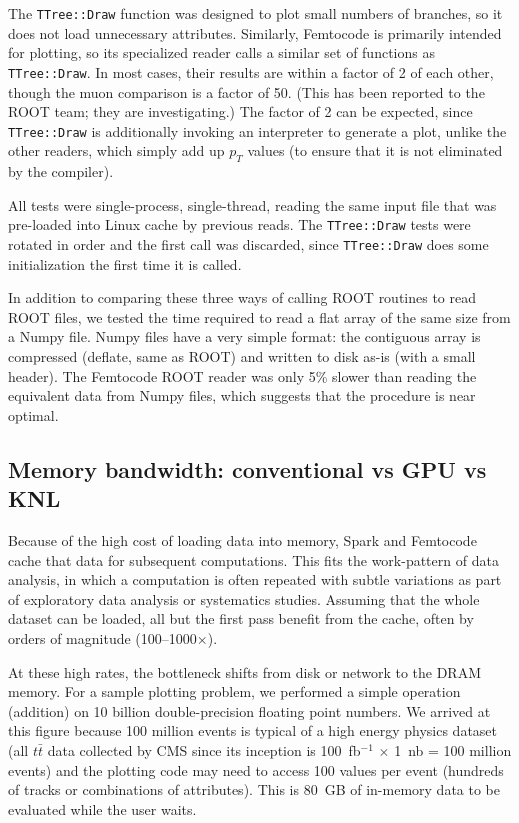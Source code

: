 \documentclass[12pt]{article}
\begin{document}
The {\tt TTree::Draw} function was designed to plot small numbers of branches, so it does not load unnecessary attributes. Similarly, Femtocode is primarily intended for plotting, so its specialized reader calls a similar set of functions as {\tt TTree::Draw}. In most cases, their results are within a factor of 2 of each other, though the muon comparison is a factor of 50. (This has been reported to the ROOT team; they are investigating.) The factor of 2 can be expected, since {\tt TTree::Draw} is additionally invoking an interpreter to generate a plot, unlike the other readers, which simply add up $p_T$ values (to ensure that it is not eliminated by the compiler).

All tests were single-process, single-thread, reading the same input file that was pre-loaded into Linux cache by previous reads. The {\tt TTree::Draw} tests were rotated in order and the first call was discarded, since {\tt TTree::Draw} does some initialization the first time it is called.

In addition to comparing these three ways of calling ROOT routines to read ROOT files, we tested the time required to read a flat array of the same size from a Numpy file. Numpy files have a very simple format: the contiguous array is compressed (deflate, same as ROOT) and written to disk as-is (with a small header). The Femtocode ROOT reader was only 5\% slower than reading the equivalent data from Numpy files, which suggests that the procedure is near optimal.

\subsection*{Memory bandwidth: conventional vs GPU vs KNL}

Because of the high cost of loading data into memory, Spark and Femtocode cache that data for subsequent computations. This fits the work-pattern of data analysis, in which a computation is often repeated with subtle variations as part of exploratory data analysis or systematics studies. Assuming that the whole dataset can be loaded, all but the first pass benefit from the cache, often by orders of magnitude (100--1000$\times$).

At these high rates, the bottleneck shifts from disk or network to the DRAM memory. For a sample plotting problem, we performed a simple operation (addition) on 10 billion double-precision floating point numbers. We arrived at this figure because 100 million events is typical of a high energy physics dataset (all $t\bar{t}$ data collected by CMS since its inception is 100~fb$^{-1}$ $\times$ 1~nb = 100 million events) and the plotting code may need to access 100 values per event (hundreds of tracks or combinations of attributes). This is 80~GB of in-memory data to be evaluated while the user waits.
\end{document}
